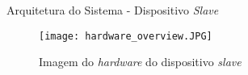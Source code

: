 \begin{frame}{Arquitetura do Sistema - Dispositivo \emph{Slave}}
	\begin{figure}
		\centering
		\texttt{[image: hardware\_overview.JPG]}
		\caption{Imagem do \emph{hardware} do dispositivo \emph{slave}}
	\end{figure}
\end{frame}